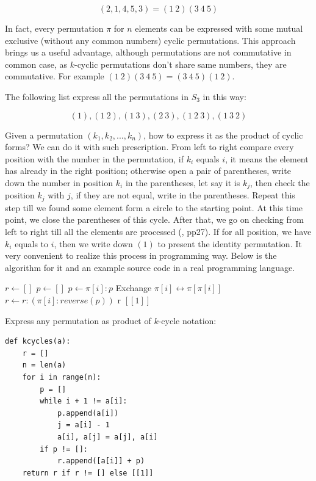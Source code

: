 \documentclass{article}
\begin{document}
\[
(2, 1, 4, 5, 3) = (1\ 2)(3\ 4\ 5)
\]

In fact, every permutation $\pi$ for $n$ elements can be expressed with some mutual exclusive (without any common numbers) cyclic permutations. This approach brings us a useful advantage, although permutations are not commutative in common case, as $k$-cyclic permutations don't share same numbers, they are commutative. For example $(1\ 2)(3\ 4\ 5) = (3\ 4\ 5)(1\ 2)$.

The following list express all the permutations in $S_3$ in this way:

\[
(1),
(1\ 2), (1\ 3), (2\ 3),
(1\ 2\ 3), (1\ 3\ 2)
\]

Given a permutation $(k_1, k_2, ..., k_n)$, how to express it as the product of cyclic forms? We can do it with such prescription. From left to right compare every position with the number in the permutation, if $k_i$ equals $i$, it means the element has already in the right position; otherwise open a pair of parentheses, write down the number in position $k_i$ in the parentheses, let say it is $k_j$, then check the position $k_j$ with $j$, if they are not equal, write in the parentheses. Repeat this step till we found some element form a circle to the starting point. At this time point, we close the parentheses of this cycle. After that, we go on checking from left to right till all the elements are processed (\cite{Armstrong1988}, pp27). If for all position, we have $k_i$ equals to $i$, then we write down $(1)$ to present the identity permutation. It very convenient to realize this process in programming way. Below is the algorithm for it and an example source code in a real programming language.

\begin{algorithmic}
  \State $r \gets []$
    \State $p \gets []$
      \State $p \gets \pi[i]:p$
      \State Exchange $\pi[i] \leftrightarrow \pi[\pi[i]]$
    \EndWhile
      \State $r \gets r:(\pi[i]:reverse(p))$
    \EndIf
  \EndFor
    \State \Return r
  \Else
    \State \Return $[[1]]$ 
  \EndIf
\EndFunction
\end{algorithmic}

Express any permutation as product of $k$-cycle notation:

\lstset{language=Python}
\begin{lstlisting}
def kcycles(a):
    r = []
    n = len(a)
    for i in range(n):
        p = []
        while i + 1 != a[i]:
            p.append(a[i])
            j = a[i] - 1
            a[i], a[j] = a[j], a[i]
        if p != []:
            r.append([a[i]] + p)
    return r if r != [] else [[1]]
\end{lstlisting}
\end{document}
